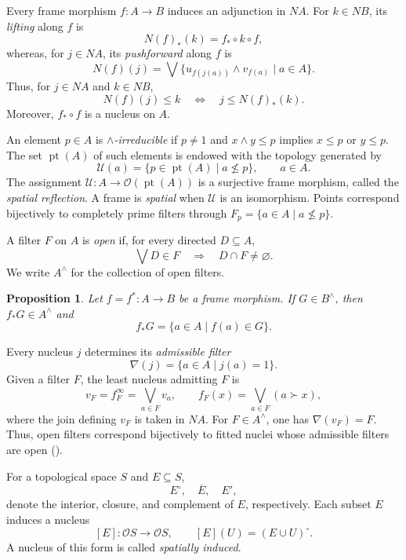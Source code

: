 \documentclass[11pt]{amsart}
\DeclareMathOperator{\pt}{pt}
\theoremstyle{plain}
\newtheorem{prop}[thm]{Proposition}
\theoremstyle{definition}
\begin{document}
Every frame morphism $f\colon A\to B$ induces an adjunction in $NA$.
For $k\in NB$, its \emph{lifting} along $f$ is
\begin{equation}\label{levantamiento}
N(f)_*(k)=f_*\circ k\circ f,
\end{equation}
whereas, for $j\in NA$, its \emph{pushforward} along $f$ is
\begin{equation}\label{empuje}
N(f)(j)=\bigvee\{u_{f(j(a))}\wedge v_{f(a)}\mid a\in A\}.
\end{equation}
Thus, for $j\in NA$ and $k\in NB$,
\[
N(f)(j)\leq k
\quad\Longleftrightarrow\quad
j\leq N(f)_*(k).
\]
Moreover, $f_*\circ f$ is a nucleus on $A$. 

An element $p\in A$ is \emph{$\wedge$-irreducible} if $p\neq1$ and
$x\wedge y\leq p$ implies $x\leq p$ or $y\leq p$.
The set $\pt(A)$ of such elements is endowed with the topology generated by
\[
\mathcal U(a)=\{p\in\pt(A)\mid a\nleq p\},\qquad a\in A.
\]
The assignment $\mathcal U\colon A\to\mathcal O(\pt(A))$ is a surjective frame morphism, called the \emph{spatial reflection}. A frame is \emph{spatial} when $\mathcal U$ is an isomorphism. Points correspond bijectively to completely prime filters through
$F_p=\{a\in A\mid a\nleq p\}$.

A filter $F$ on $A$ is \emph{open} if, for every directed $D\subseteq A$,
\[
\bigvee D\in F\quad\Longrightarrow\quad D\cap F\neq\varnothing.
\]
We write $A^\wedge$ for the collection of open filters.

\begin{prop}\label{fF}
Let $f=f^*\colon A\to B$ be a frame morphism. If $G\in B^\wedge$, then $f_*G\in A^\wedge$ and
\begin{equation}\label{Imagenfiltros}
f_*G=\{a\in A\mid f(a)\in G\}.
\end{equation}
\end{prop}

Every nucleus $j$ determines its \emph{admissible filter}
\[
\nabla(j)=\{a\in A\mid j(a)=1\}.
\]
Given a filter $F$, the least nucleus admitting $F$ is
\begin{equation}\label{fittednuclei}
v_F=f_F^\infty=\bigvee_{a\in F}v_a,
\qquad
f_F(x)=\bigvee_{a\in F}(a\succ x),
\end{equation}
where the join defining $v_F$ is taken in $NA$.
For $F\in A^\wedge$, one has $\nabla(v_F)=F$. Thus, open filters correspond bijectively to fitted nuclei whose admissible filters are open (\cite[Lemmas 4.2 and 4.3]{escardo2003joins}).

For a topological space $S$ and $E\subseteq S$, 
\[
E^\circ,\quad \overline{E}, \quad E',
\]
denote the interior, closure, and complement of $E$, respectively. Each subset $E$ induces a nucleus
\[
[E]\colon \mathcal OS\longrightarrow\mathcal OS,
\qquad
[E](U)=(E\cup U)^\circ.
\]
A nucleus of this form is called \emph{spatially induced}.
\end{document}
